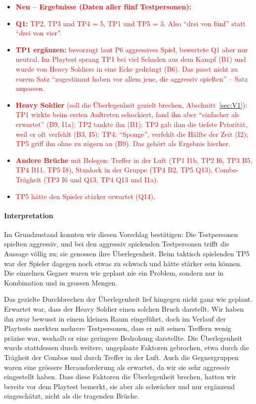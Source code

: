 \documentclass[../Main.tex]{subfiles}
\begin{document}
\begin{itemize}[leftmargin=1.5cm]
    \item \textcolor{red}{\textbf{Neu -- Ergebnisse (Daten aller fünf Testpersonen):}}
    \item \textcolor{red}{\textbf{Q1:} TP2, TP3 und TP4 = 5, TP1 und TP5 = 3. Also \enquote{drei von fünf} statt \enquote{drei von vier}.}
    \item \textcolor{red}{\textbf{TP1 ergänzen:} bevorzugt laut P6 aggressives Spiel, bewertete Q1 aber nur neutral. Im Playtest sprang TP1 bei viel Schaden aus dem Kampf (B1) und wurde von Heavy Soldiers in eine Ecke gedrängt (B6). Das passt nicht zu eurem Satz \enquote{zugestimmt haben vor allem jene, die aggressiv spielten} -- Satz anpassen.}
    \item \textcolor{red}{\textbf{Heavy Soldier} (soll die Überlegenheit gezielt brechen, Abschnitt~\ref{sec:V1}): TP1 wirkte beim ersten Auftreten schockiert, fand ihn aber \enquote{einfacher als erwartet} (B9, I1a); TP2 tankte ihn (B1); TP3 gab ihm die tiefste Priorität, weil er oft verfehlt (B3, I5); TP4: \enquote{Sponge}, verfehlt die Hälfte der Zeit (I2); TP5 griff ihn ohne zu zögern an (B9). Das gehört als Ergebnis hierher.}
    \item \textcolor{red}{\textbf{Andere Brüche} mit Belegen: Treffer in der Luft (TP1 I1b, TP2 I6, TP3 B5, TP4 B11, TP5 I8), Stunlock in der Gruppe (TP4 B2, TP5 Q13), Combo-Trägheit (TP3 I6 und Q13, TP4 Q13 und I1a).}
    \item \textcolor{red}{TP5 hätte den Spieler stärker erwartet (Q14).}
\end{itemize}

\paragraph{Interpretation}
Im Grundzustand konnten wir diesen Vorschlag bestätigen: Die Testpersonen spielten aggressiv, und bei den aggressiv spielenden Testpersonen trifft die Aussage völlig zu; sie genossen ihre Überlegenheit. Beim taktisch spielenden TP5 war der Spieler dagegen noch etwas zu schwach und hätte stärker sein können. Die einzelnen Gegner waren wie geplant nie ein Problem, sondern nur in Kombination und in grossen Mengen.

Das gezielte Durchbrechen der Überlegenheit lief hingegen nicht ganz wie geplant. Erwartet war, dass der Heavy Soldier einen solchen Bruch darstellt. Wir haben ihn zwar bewusst in einem kleinen Raum eingeführt, doch im Verlauf der Playtests merkten mehrere Testpersonen, dass er mit seinen Treffern wenig präzise war, weshalb er eine geringere Bedrohung darstellte. Die Überlegenheit wurde stattdessen durch weitere, ungeplante Faktoren gebrochen, etwa durch die Trägheit der Combos und durch Treffer in der Luft. Auch die Gegnergruppen waren eine grössere Herausforderung als erwartet, da wir sie sehr aggressiv eingestellt haben. Dass diese Faktoren die Überlegenheit brechen, hatten wir bereits vor dem Playtest bemerkt, sie aber als schwächer und nur ergänzend eingeschätzt, nicht als die tragenden Brüche.
\end{document}
